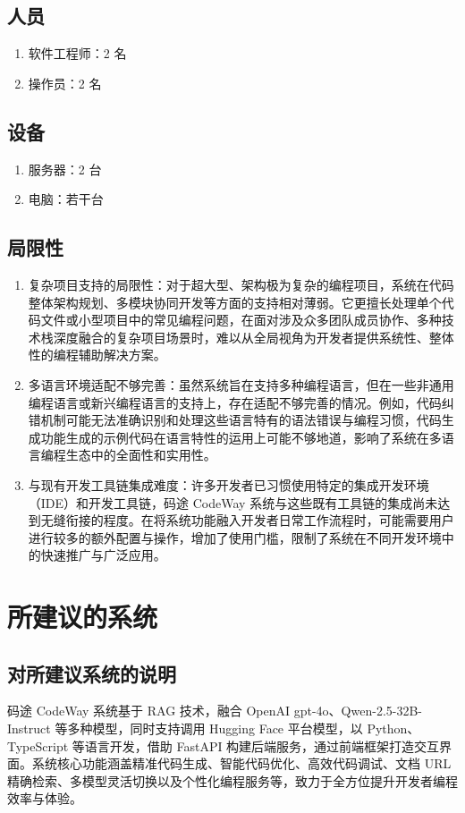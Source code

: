 \documentclass[
    report,     %
    oneside,    %
    UTF8,       %
    zihao=-4    %
]{config} %
\begin{document}
\subsection{人员}
\begin{enumerate}[label=(\arabic*)]
    \item 软件工程师：2 名
    \item 操作员：2 名
\end{enumerate}
\subsection{设备}
\begin{enumerate}[label=(\arabic*)]
    \item 服务器：2 台
    \item 电脑：若干台
\end{enumerate}
\subsection{局限性}
\begin{enumerate}[label=(\arabic*)]
    \item 复杂项目支持的局限性：对于超大型、架构极为复杂的编程项目，系统在代码整体架构规划、多模块协同开发等方面的支持相对薄弱。它更擅长处理单个代码文件或小型项目中的常见编程问题，在面对涉及众多团队成员协作、多种技术栈深度融合的复杂项目场景时，难以从全局视角为开发者提供系统性、整体性的编程辅助解决方案。
    \item 多语言环境适配不够完善：虽然系统旨在支持多种编程语言，但在一些非通用编程语言或新兴编程语言的支持上，存在适配不够完善的情况。例如，代码纠错机制可能无法准确识别和处理这些语言特有的语法错误与编程习惯，代码生成功能生成的示例代码在语言特性的运用上可能不够地道，影响了系统在多语言编程生态中的全面性和实用性。
    \item 与现有开发工具链集成难度：许多开发者已习惯使用特定的集成开发环境（IDE）和开发工具链，码途 CodeWay 系统与这些既有工具链的集成尚未达到无缝衔接的程度。在将系统功能融入开发者日常工作流程时，可能需要用户进行较多的额外配置与操作，增加了使用门槛，限制了系统在不同开发环境中的快速推广与广泛应用。
\end{enumerate}
\section{所建议的系统}
\subsection{对所建议系统的说明}
码途 CodeWay 系统基于 RAG 技术，融合 OpenAI gpt-4o、Qwen-2.5-32B-Instruct 等多种模型，同时支持调用 Hugging Face 平台模型，以 Python、TypeScript 等语言开发，借助 FastAPI 构建后端服务，通过前端框架打造交互界面。系统核心功能涵盖精准代码生成、智能代码优化、高效代码调试、文档 URL 精确检索、多模型灵活切换以及个性化编程服务等，致力于全方位提升开发者编程效率与体验。
\end{document}
